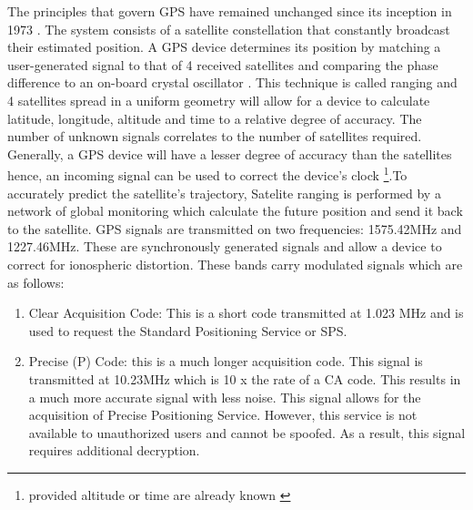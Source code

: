 The principles that govern GPS have remained unchanged since its inception in 1973 \cite{spilker1996global}. The system consists of a satellite constellation that constantly broadcast their estimated position. A GPS device determines its position by matching a user-generated signal to that of 4 received satellites and comparing the phase difference to an on-board crystal oscillator \cite{spilker1996global}. This technique is called ranging and 4 satellites spread in a uniform geometry will allow for a device to calculate latitude, longitude, altitude and time to a relative degree of accuracy. The number of unknown signals correlates to the number of satellites required. Generally, a GPS device will have a lesser degree of accuracy than the satellites hence, an incoming signal can be used to correct the device's clock \footnote{provided altitude or time are already known \cite{spilker1996global}}.To accurately predict the satellite's trajectory, Satelite ranging is performed by a network of global monitoring which calculate the future position and send it back to the satellite. GPS signals are transmitted on two frequencies: 1575.42MHz and 1227.46MHz\cite{spilker1996global}. These are synchronously generated signals and allow a device to correct for ionospheric distortion. These bands carry modulated signals which are as follows: \cite{spilker1996global}


\begin{enumerate}
    \item Clear Acquisition Code:  This is a short code transmitted at 1.023 MHz and is used to request the Standard Positioning Service or SPS.
    \item Precise (P) Code: this is a much longer acquisition code. This signal is transmitted at 10.23MHz which is 10 x the rate of a CA code. This results in a much more accurate signal with less noise. This signal allows for the acquisition of Precise Positioning Service. However, this service is not available to unauthorized users and cannot be spoofed. As a result, this signal requires additional decryption.    
\end{enumerate}

